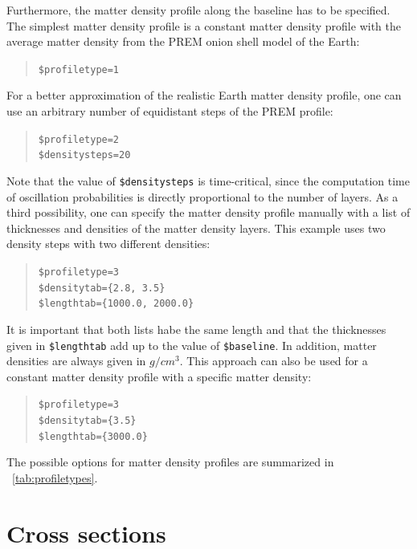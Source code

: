 
Furthermore, the matter density profile along the baseline
has to be specified. The simplest matter density profile is a constant matter density profile with the average matter density from the PREM\cite{Stacey} onion shell model of the Earth:
\begin{quote}
{\tt \$profiletype=1 }
\end{quote}
%
For a better approximation of the realistic Earth matter density profile, one can use an arbitrary number of equidistant steps of the PREM profile:
\begin{quote}
{\tt \$profiletype=2 } \\
{\tt \$densitysteps=20 }
\end{quote}
Note that the value of {\tt \$densitysteps} is time-critical, since the
computation time of oscillation probabilities is directly 
proportional to the number of layers.
%
As a  third possibility, one can specify the matter density profile 
manually with a list of thicknesses and densities of the matter density layers. This example uses two density steps with two different densities:
\begin{quote}
{\tt \$profiletype=3 } \\
{\tt \$densitytab=\{2.8, 3.5\}}\\
{\tt \$lengthtab=\{1000.0, 2000.0\}}\\
\end{quote}
It is important that both lists habe the same length and that the  thicknesses given in  {\tt \$lengthtab} add up to the value of
{\tt \$baseline}. In addition, matter densities are always given in $g/cm^3$.
%
This approach can also be used for a constant matter density profile with
a specific matter density:
\begin{quote}
{\tt \$profiletype=3 } \\
{\tt \$densitytab=\{3.5\}}\\
{\tt \$lengthtab=\{3000.0\}}\\
\end{quote}
The possible options for matter density profiles are summarized in \Tab~\ref{tab:profiletypes}.


\section{Cross sections}
\label{sec:cross_section}

